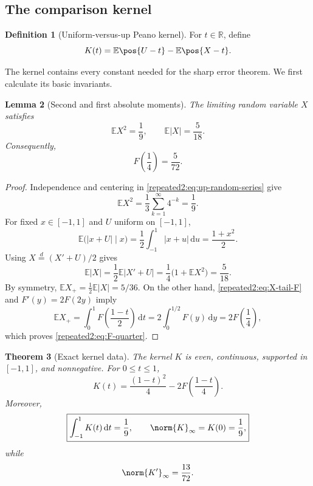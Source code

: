 \documentclass[11pt,oneside]{article}
\newtheorem{theorem}{Theorem}[section]
\newtheorem{lemma}[theorem]{Lemma}
\theoremstyle{definition}
\newtheorem{definition}[theorem]{Definition}
\theoremstyle{remark}
\newcommand{\R}{\mathbb R}
\newcommand{\dd}{\,\mathrm d}
\newcommand{\E}{\mathbb E}
\begin{document}
\subsection{The comparison kernel}

\begin{definition}[Uniform-versus-up Peano kernel]
\label{repeated2:def:comparison-kernel}
For $t\in\R$, define
\begin{equation}
 K(t)=\E\pos{U-t}-\E\pos{X-t}.
 \label{repeated2:eq:K-definition}
\end{equation}
\end{definition}

The kernel contains every constant needed for the sharp error theorem.  We first calculate
its basic invariants.

\begin{lemma}[Second and first absolute moments]
\label{repeated2:lem:up-moments}
The limiting random variable $X$ satisfies
\begin{equation}
 \E X^2=\frac19,
 \qquad
 \E|X|=\frac5{18}.
 \label{repeated2:eq:X-moments}
\end{equation}
Consequently,
\begin{equation}
 F\left(\frac14\right)=\frac5{72}.
 \label{repeated2:eq:F-quarter}
\end{equation}
\end{lemma}

\begin{proof}
Independence and centering in \eqref{repeated2:eq:up-random-series} give
\[
 \E X^2=\frac13\sum_{k=1}^{\infty}4^{-k}=\frac19.
\]
For fixed $x\in[-1,1]$ and $U$ uniform on $[-1,1]$,
\[
 \E\bigl(|x+U|\mid x\bigr)=\frac12\int_{-1}^{1}|x+u|\dd u
 =\frac{1+x^2}{2}.
\]
Using $X\stackrel d=(X'+U)/2$ gives
\[
 \E|X|=\frac12\E|X'+U|
 =\frac14\bigl(1+\E X^2\bigr)=\frac5{18}.
\]
By symmetry, $\E X_+=\frac12\E|X|=5/36$.  On the other hand,
\eqref{repeated2:eq:X-tail-F} and $F'(y)=2F(2y)$ imply
\[
 \E X_+=\int_0^1F\left(\frac{1-t}{2}\right)\dd t
 =2\int_0^{1/2}F(y)\dd y=2F\left(\frac14\right),
\]
which proves \eqref{repeated2:eq:F-quarter}.
\end{proof}

\begin{theorem}[Exact kernel data]
\label{repeated2:thm:kernel-data}
The kernel $K$ is even, continuous, supported in $[-1,1]$, and nonnegative.  For
$0\le t\le1$,
\begin{equation}
 K(t)=\frac{(1-t)^2}{4}-2F\left(\frac{1-t}{4}\right).
 \label{repeated2:eq:K-explicit}
\end{equation}
Moreover,
\begin{equation}
 \boxed{\displaystyle
 \int_{-1}^{1}K(t)\dd t=\frac19,
 \qquad
 \norm{K}_\infty=K(0)=\frac19,}
 \label{repeated2:eq:K-mass-and-max}
\end{equation}
while
\begin{equation}
 \norm{K'}_\infty=\frac{13}{72}.
 \label{repeated2:eq:Kprime-max}
\end{equation}
\end{theorem}
\end{document}
